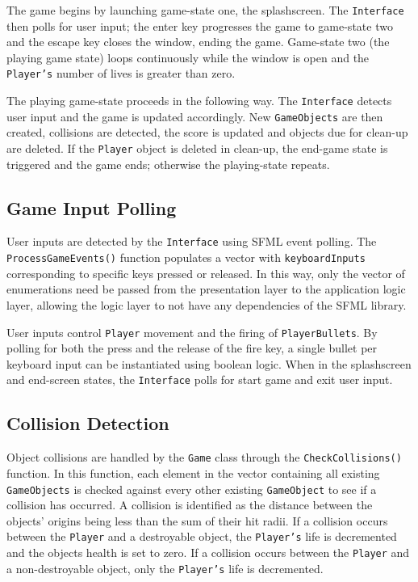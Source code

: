 \documentclass[10pt,twocolumn]{witseiepaper}
\begin{document}
The game begins by launching game-state one, the splashscreen. The \texttt{Interface} then polls for user input; the enter key progresses the game to game-state two and the escape key closes the window, ending the game. Game-state two (the playing game state) loops continuously while the window is open and the \texttt{Player's} number of lives is greater than zero. 

The playing game-state proceeds in the following way. The \texttt{Interface} detects user input and the game is updated accordingly. New \texttt{GameObjects} are then created, collisions are detected, the score is updated and objects due for clean-up are deleted. If the \texttt{Player} object is deleted in clean-up, the end-game state is triggered and the game ends; otherwise the playing-state repeats.

\subsection{Game Input Polling}

User inputs are detected by the \texttt{Interface} using SFML event polling. The \texttt{ProcessGameEvents()} function populates a vector with \texttt{keyboardInputs} corresponding to specific keys pressed or released. In this way, only the vector of enumerations need be passed from the presentation layer to the application logic layer, allowing the logic layer to not have any dependencies of the SFML library.

User inputs control \texttt{Player} movement and the firing of \texttt{PlayerBullets}. By polling for both the press and the release of the fire key, a single bullet per keyboard input can be instantiated using boolean logic. When in the splashscreen and end-screen states, the \texttt{Interface} polls for start game and exit user input.

\subsection{Collision Detection}\label{collision_detection}

Object collisions are handled by the \texttt{Game} class through the \texttt{CheckCollisions()} function. In this function, each element in the vector containing all existing \texttt{GameObjects} is checked against every other existing \texttt{GameObject} to see if a collision has occurred. A collision is identified as the distance between the objects' origins being less than the sum of their hit radii. If a collision occurs between the \texttt{Player} and a destroyable object, the \texttt{Player's} life is decremented and the objects health is set to zero. If a collision occurs between the \texttt{Player} and a non-destroyable object, only the \texttt{Player's} life is decremented.
\end{document}
